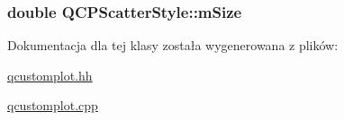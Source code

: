 \subsubsection[{\texorpdfstring{m\+Size}{mSize}}]{\setlength{\rightskip}{0pt plus 5cm}double Q\+C\+P\+Scatter\+Style\+::m\+Size\hspace{0.3cm}{\ttfamily [protected]}}\hypertarget{class_q_c_p_scatter_style_a757da98671eb06b221979373ac2cec91}{}\label{class_q_c_p_scatter_style_a757da98671eb06b221979373ac2cec91}


Dokumentacja dla tej klasy została wygenerowana z plików\+:\begin{DoxyCompactItemize}
\item 
\hyperlink{qcustomplot_8hh}{qcustomplot.\+hh}\item 
\hyperlink{qcustomplot_8cpp}{qcustomplot.\+cpp}\end{DoxyCompactItemize}
